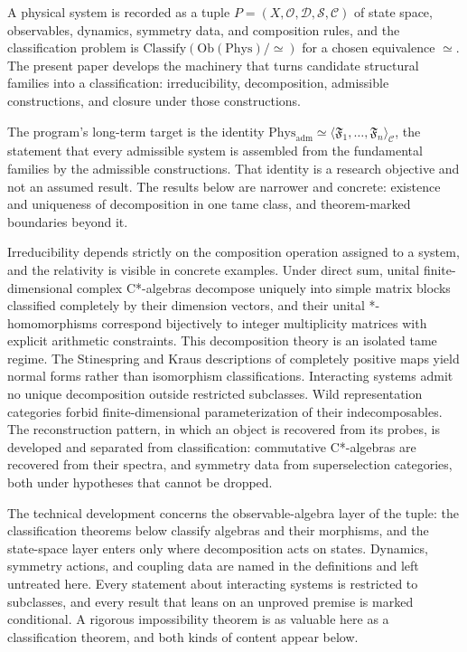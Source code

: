 \documentclass[11pt,letterpaper]{article}
\theoremstyle{definition}
\theoremstyle{remark}
\begin{document}
A physical system is recorded as a tuple $P = (X, \mathcal{O}, \mathcal{D}, \mathcal{S}, \mathcal{C})$ of state space, observables, dynamics, symmetry data, and composition rules, and the classification problem is $\mathrm{Classify}(\mathrm{Ob}(\mathrm{Phys})/{\simeq})$ for a chosen equivalence $\simeq$. The present paper develops the machinery that turns candidate structural families into a classification: irreducibility, decomposition, admissible constructions, and closure under those constructions.

The program's long-term target is the identity $\mathrm{Phys}_{\mathrm{adm}} \simeq \langle \mathfrak{F}_1, \dots, \mathfrak{F}_n \rangle_{\mathcal{C}}$, the statement that every admissible system is assembled from the fundamental families by the admissible constructions. That identity is a research objective and not an assumed result. The results below are narrower and concrete: existence and uniqueness of decomposition in one tame class, and theorem-marked boundaries beyond it.

Irreducibility depends strictly on the composition operation assigned to a system, and the relativity is visible in concrete examples. Under direct sum, unital finite-dimensional complex C*-algebras decompose uniquely into simple matrix blocks classified completely by their dimension vectors, and their unital *-homomorphisms correspond bijectively to integer multiplicity matrices with explicit arithmetic constraints. This decomposition theory is an isolated tame regime. The Stinespring and Kraus descriptions of completely positive maps yield normal forms rather than isomorphism classifications. Interacting systems admit no unique decomposition outside restricted subclasses. Wild representation categories forbid finite-dimensional parameterization of their indecomposables. The reconstruction pattern, in which an object is recovered from its probes, is developed and separated from classification: commutative C*-algebras are recovered from their spectra, and symmetry data from superselection categories, both under hypotheses that cannot be dropped.

The technical development concerns the observable-algebra layer of the tuple: the classification theorems below classify algebras and their morphisms, and the state-space layer enters only where decomposition acts on states. Dynamics, symmetry actions, and coupling data are named in the definitions and left untreated here. Every statement about interacting systems is restricted to subclasses, and every result that leans on an unproved premise is marked conditional. A rigorous impossibility theorem is as valuable here as a classification theorem, and both kinds of content appear below.
\end{document}
